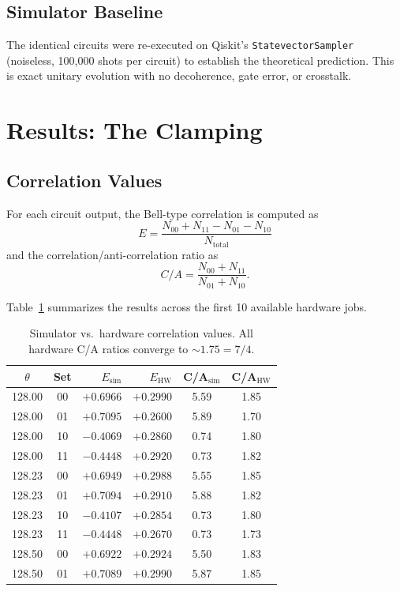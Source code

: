 \documentclass[11pt,twocolumn]{article}
\begin{document}
\subsection{Simulator Baseline}

The identical circuits were re-executed on Qiskit's
\texttt{StatevectorSampler} (noiseless, 100{,}000 shots per circuit) to
establish the theoretical prediction.  This is exact unitary evolution
with no decoherence, gate error, or crosstalk.

\section{Results: The Clamping}

\subsection{Correlation Values}

For each circuit output, the Bell-type correlation is computed as
\begin{equation}
  E = \frac{N_{00} + N_{11} - N_{01} - N_{10}}{N_{\mathrm{total}}}
\end{equation}
and the correlation/anti-correlation ratio as
\begin{equation}
  C/A = \frac{N_{00} + N_{11}}{N_{01} + N_{10}}.
\end{equation}

Table~\ref{tab:clamping} summarizes the results across the first 10
available hardware jobs.

\begin{table}[H]
\centering
\caption{Simulator vs.\ hardware correlation values.  All hardware
  C/A ratios converge to $\sim 1.75 = 7/4$.}
\label{tab:clamping}
\small
\begin{tabular}{@{}ccrrcc@{}}
\toprule
$\theta$ & Set & $E_{\mathrm{sim}}$ & $E_{\mathrm{HW}}$ & C/A$_{\mathrm{sim}}$ & C/A$_{\mathrm{HW}}$ \\
\midrule
128.00 & 00 & $+0.6966$ & $+0.2990$ & 5.59 & 1.85 \\
128.00 & 01 & $+0.7095$ & $+0.2600$ & 5.89 & 1.70 \\
128.00 & 10 & $-0.4069$ & $+0.2860$ & 0.74 & 1.80 \\
128.00 & 11 & $-0.4448$ & $+0.2920$ & 0.73 & 1.82 \\
128.23 & 00 & $+0.6949$ & $+0.2988$ & 5.55 & 1.85 \\
128.23 & 01 & $+0.7094$ & $+0.2910$ & 5.88 & 1.82 \\
128.23 & 10 & $-0.4107$ & $+0.2854$ & 0.73 & 1.80 \\
128.23 & 11 & $-0.4448$ & $+0.2670$ & 0.73 & 1.73 \\
128.50 & 00 & $+0.6922$ & $+0.2924$ & 5.50 & 1.83 \\
128.50 & 01 & $+0.7089$ & $+0.2990$ & 5.87 & 1.85 \\
\bottomrule
\end{tabular}
\end{table}
\end{document}
